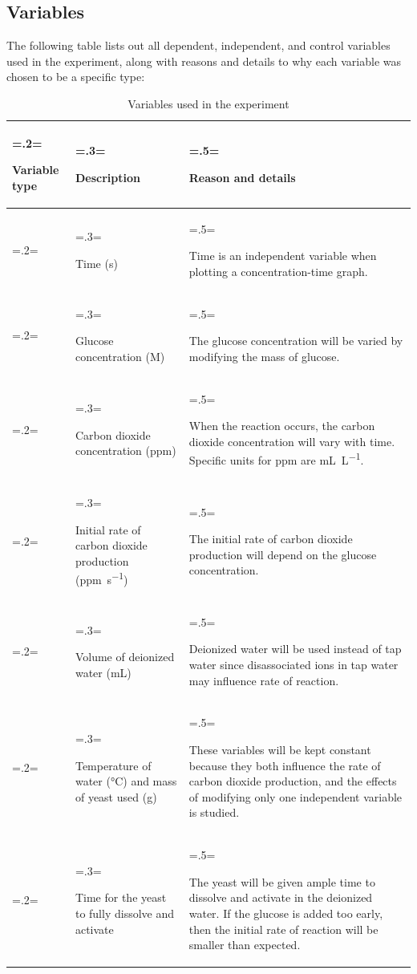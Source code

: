 \documentclass{article}
\begin{document}
\subsection{Variables}
The following table lists out all dependent, independent, and control variables used in the experiment, along with reasons and details to why each variable was chosen to be a specific type:
\begin{table}[H]
\centering
\caption{Variables used in the experiment}
\label{table:2}
\begin{tabularx}{\textwidth} {
    | >{\hsize=.2\hsize \linewidth=\hsize \raggedright\arraybackslash}X
    | >{\hsize=.3\hsize \linewidth=\hsize \raggedright\arraybackslash}X
    | >{\hsize=.5\hsize \linewidth=\hsize \raggedright\arraybackslash}X |}
    \hline
    \textbf{Variable type} & \textbf{Description} & \textbf{Reason and details} \\
    \hline
    \multirow[t]{2}{\hsize}{Independent} & Time (\si{s}) & Time is an independent variable when plotting a concentration-time graph. \\
    \cline{2-3}
    & Glucose concentration (\si{M}) & The glucose concentration will be varied by modifying the mass of glucose. \\
    \hline
    \multirow[t]{2}{\hsize}{Dependent} & Carbon dioxide concentration (\si{ppm}) & When the reaction occurs, the carbon dioxide concentration will vary with time. Specific units for ppm are \si{mL.L^{-1}}. \\
    \cline{2-3}
    & Initial rate of carbon dioxide production (\si{ppm.s^{-1}}) & The initial rate of carbon dioxide production will depend on the glucose concentration. \\
    \hline
    \multirow[t]{3}{\hsize}{Control} & Volume of deionized water (\si{mL}) & Deionized water will be used instead of tap water since disassociated ions in tap water may influence rate of reaction. \\
    \cline{2-3}
    & Temperature of water (\si{\celsius}) and mass of yeast used (\si{g}) & These variables will be kept constant because they both influence the rate of carbon dioxide production, and the effects of modifying only one independent variable is studied. \\
    \cline{2-3}
    & Time for the yeast to fully dissolve and activate & The yeast will be given ample time to dissolve and activate in the deionized water. If the glucose is added too early, then the initial rate of reaction will be smaller than expected. \\
    \hline
\end{tabularx}
\end{table}
\end{document}
